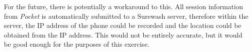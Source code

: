             For the future, there is potentially a workaround to this. All session information from {\slshape Pocket} is automatically submitted to a Surewash server, therefore within the server, the IP address of the phone could be recorded and the location could be obtained from the IP address. This would not be entirely accurate, but it would be good enough for the purposes of this exercise.


